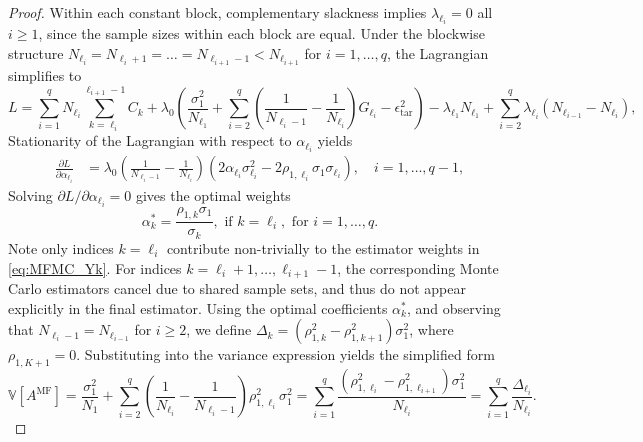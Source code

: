 \begin{proof}
Within each constant block, complementary slackness implies $\lambda_{\ell_i}= 0$ all $i\ge 1$, since the sample sizes within each block are equal. Under the blockwise structure $N_{\ell_i}=N_{\ell_i+1}=\ldots=N_{\ell_{i+1}-1}< N_{\ell_{i+1}}$ for $i=1,\ldots,q$, the Lagrangian simplifies to
%
\begin{equation*}
L= \sum_{i=1}^q N_{\ell_i}\sum_{k=\ell_i}^{\ell_{i+1}-1} C_k +\lambda_0 \left(\frac{\sigma_1^2}{N_{\ell_1}} + \sum_{i=2}^q \left(\frac{1}{N_{\ell_i-1}} - \frac{1}{N_{\ell_i}}\right)G_{\ell_i}- \epsilon_{\text{tar}}^2\right)-\lambda_{\ell_1} N_{\ell_1}+\sum_{i=2}^q\lambda_{\ell_{i}}(N_{\ell_{i-1}} - N_{\ell_{i}}),
\end{equation*}
%
Stationarity of the Lagrangian with respect to $\alpha_{\ell_i}$ yields
%
\begin{align}
\label{eq:partial_L_alpha_k}
    \frac{\partial L}{\partial \alpha_{\ell_i}}&=\lambda_0\left(\frac{1}{N_{\ell_i-1}} - \frac{1}{N_{\ell_i}}\right)\left(2\alpha_{\ell_i}\sigma_{\ell_i}^2 - 2\rho_{1,\ell_i}\sigma_1\sigma_{\ell_i}\right),\quad i=1,\dots,q-1,
\end{align}
%
Solving $\partial L/\partial \alpha_{\ell_i} = 0$ gives the optimal weights
%
\[
\alpha_{k}^* = \frac{\rho_{1,k}\sigma_1}{\sigma_{k}}, \text{ if } k=\ell_i, \text{ for }i= 1,\ldots,q.
\]
%
Note only indices $k=\ell_i$ contribute non-trivially to the estimator weights in \eqref{eq:MFMC_Yk}. For indices $k = \ell_i+1,\ldots, \ell_{i+1}-1$, the corresponding Monte Carlo estimators cancel due to shared sample sets, and thus do not appear explicitly in the final estimator. Using the optimal coefficients $\alpha_k^*$, and observing that $N_{\ell_{i}-1} = N_{\ell_{i-1}}$ for $i \ge 2$, we define $\Delta_k = (\rho_{1,k}^2 - \rho_{1,k+1}^2)\sigma_1^2$, where $\rho_{1,K+1} = 0$. Substituting into the variance expression yields the simplified form
%
\begin{equation}\label{eq:MFMC_var_convex}
    \mathbb{V}\left[A^{\text{MF}}\right] = \frac{\sigma_1^2}{N_1}+\sum_{i=2}^q
\left(\frac{1}{N_{\ell_{i}}}-\frac{1}{N_{\ell_{i}-1}}\right)\rho_{1,\ell_i}^2\sigma_1^2=\sum_{i=1}^{q} \frac{ \left(\rho_{1,\ell_i}^2-\rho_{1,\ell_{i+1}}^2\right)\sigma_1^2}{N_{\ell_i}}=\sum_{i=1}^{q} \frac{\Delta_{\ell_i}}{N_{\ell_i}}.
\end{equation}
%


\end{proof}
